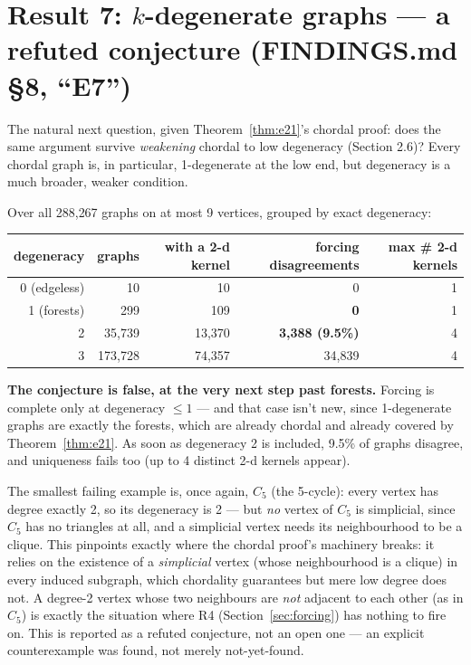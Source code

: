 \documentclass[11pt]{article}
\theoremstyle{plain}
\theoremstyle{definition}
\theoremstyle{remark}
\begin{document}
\section{Result 7: $k$-degenerate graphs --- a refuted conjecture (FINDINGS.md \S8, ``E7'')}
\label{sec:e7}

The natural next question, given Theorem~\ref{thm:e21}'s chordal proof: does the same
argument survive \emph{weakening} chordal to low degeneracy (Section 2.6)? Every
chordal graph is, in particular, 1-degenerate at the low end, but degeneracy is a much
broader, weaker condition.

Over all 288{,}267 graphs on at most 9 vertices, grouped by exact degeneracy:

\begin{center}
\begin{tabular}{@{}rrrrr@{}}
\toprule
degeneracy & graphs & with a 2-d kernel & forcing disagreements & max \# 2-d kernels\\
\midrule
0 (edgeless) & 10 & 10 & 0 & 1 \\
1 (forests) & 299 & 109 & \textbf{0} & 1 \\
2 & 35{,}739 & 13{,}370 & \textbf{3{,}388 (9.5\%)} & 4 \\
3 & 173{,}728 & 74{,}357 & 34{,}839 & 4 \\
\bottomrule
\end{tabular}
\end{center}

\textbf{The conjecture is false, at the very next step past forests.} Forcing is
complete only at degeneracy $\le 1$ — and that case isn't new, since 1-degenerate
graphs are exactly the forests, which are already chordal and already covered by
Theorem~\ref{thm:e21}. As soon as degeneracy 2 is included, 9.5\% of graphs disagree,
and uniqueness fails too (up to 4 distinct 2-d kernels appear).

The smallest failing example is, once again, $C_5$ (the 5-cycle): every vertex has
degree exactly 2, so its degeneracy is 2 — but \emph{no} vertex of $C_5$ is simplicial,
since $C_5$ has no triangles at all, and a simplicial vertex needs its neighbourhood to
be a clique. This pinpoints exactly where the chordal proof's machinery breaks: it
relies on the existence of a \emph{simplicial} vertex (whose neighbourhood is a
clique) in every induced subgraph, which chordality guarantees but mere low degree
does not. A degree-2 vertex whose two neighbours are \emph{not} adjacent to each other
(as in $C_5$) is exactly the situation where R4 (Section~\ref{sec:forcing}) has
nothing to fire on. This is reported as a refuted conjecture, not an open one — an
explicit counterexample was found, not merely not-yet-found.
\end{document}
